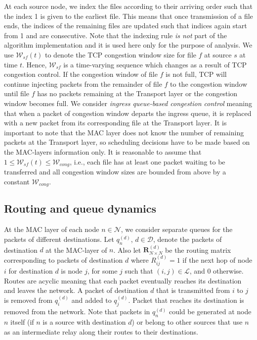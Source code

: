 \documentclass[10pt,onecolumn,draftclsnofoot,journal]{IEEEtran}
\begin{document}
At each source node, we index the files according to their arriving order such that the index 1 is given to the earliest file. This
means that once transmission of a file ends, the indices of the remaining files are updated such that indices again start from 1
and are consecutive. Note that the indexing rule \textit{is not} part of the algorithm implementation and it is used here only for the
purpose of analysis. We use $\mathcal{W}_{sf}(t)$ to denote the TCP congestion window size for file $f$ at source $s$ at time $t$. Hence, $\mathcal{W}_{sf}$ is a time-varying sequence which changes as
a result of TCP congestion control. If the congestion window
of file $f$ is not full, TCP will continue injecting packets from
the remainder of file $f$ to the congestion window until file $f$
has no packets remaining at the Transport layer or the congestion window becomes full.
We consider \textit{ingress queue-based congestion control} meaning that when a packet of congestion window
departs the ingress queue, it is replaced with a new packet from its corresponding file at the Transport layer.
It is important to note that the MAC layer does not know
the number of remaining packets at the Transport layer, so scheduling decisions have to be made based on the MAC-layers information only.
It is reasonable to assume that $1 \leq \mathcal{W}_{sf}(t) \leq \mathcal{W}_{cong}$, i.e., each file has at least one packet waiting to be transferred and all congestion window sizes are bounded from above by a constant $\mathcal{W}_{cong}$.
\subsection*{Routing and queue dynamics}
At the MAC layer of each node $n \in \mathcal{N}$, we consider separate queues for the packets of different destinations. Let $q_n^{(d)}$, $d \in \mathcal{D}$, denote the packets of destination $d$ at the MAC-layer of $n$. Also let $\mathbf{R}^{(d)}_{N \times N}$ be the routing matrix corresponding to packets of destination $d$ where $R^{(d)}_{ij}=1$ if the next hop of node $i$ for destination $d$ is node $j$, for some $j$ such that $(i,j) \in \mathcal{L}$, and $0$ otherwise. Routes are acyclic meaning that each packet eventually reaches its destination and leaves the network. A packet of destination $d$ that is transmitted from $i$ to $j$ is removed from $q^{(d)}_i$ and added to $q^{(d)}_j$. Packet that reaches its destination is removed from the network. Note that packets in $q_n^{(d)}$ could be generated at node $n$ itself (if $n$ is a source with destination $d$) or belong to other sources that use $n$ as an intermediate relay along their routes to their destinations.
\end{document}
